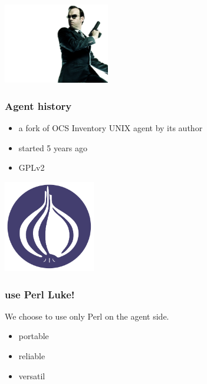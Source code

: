 %
\includegraphics[height=3.5cm]{./pics/agent-smith.jpg}

\begin{frame}
\frametitle{Agent history}

\begin{itemize}
%
\item a fork of OCS Inventory UNIX agent by its author
\item started 5 years ago
\item GPLv2
%
\end{itemize}
\end{frame}

\begin{frame}
\includegraphics[height=4.0cm]{pics/Perl_Foundation.pdf}
\frametitle{use Perl Luke!}

We choose to use only Perl on the agent side.
\begin{itemize}
\item portable
\item reliable
\item versatil
\end{itemize}
\end{frame}

